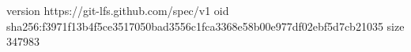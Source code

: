 version https://git-lfs.github.com/spec/v1
oid sha256:f3971f13b4f5ce3517050bad3556c1fca3368e58b00e977df02ebf5d7cb21035
size 347983
